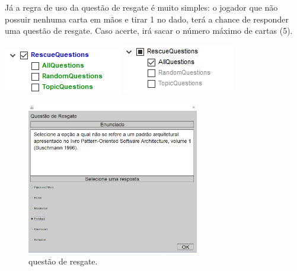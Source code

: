 \documentclass[11pt]{article}
\begin{document}
Já a regra de uso da questão de resgate é muito simples: o jogador que não possuir
nenhuma carta em mãos e tirar 1 no dado, terá a chance de responder uma questão de
resgate. Caso acerte, irá sacar o número máximo de cartas (5).
\begin{center}
\includegraphics[height=0.12\textwidth]{./img/unchosen.png}
\includegraphics[height=0.12\textwidth]{./img/chosen.png}
\end{center}
\begin{figure}[H]
\centering
\includegraphics[height=250px]{./img/question.png}
\caption{questão de resgate.}
\end{figure} 
\end{document}
